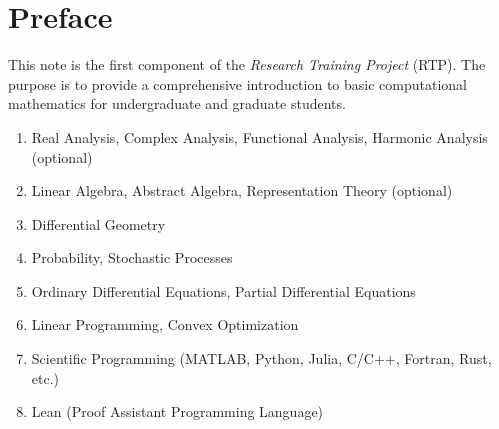 \chapter*{Preface}

This note is the first component of the \emph{Research Training Project} (RTP).  The purpose is to provide a comprehensive introduction to basic computational mathematics for undergraduate and graduate students. 

\vspace{2cm}

{}

\begin{enumerate}
    \item Real Analysis, Complex Analysis, Functional Analysis, Harmonic Analysis (optional)
    \item Linear Algebra, Abstract Algebra, Representation Theory (optional) 
    \item Differential Geometry
    \item Probability, Stochastic Processes
    \item Ordinary Differential Equations, Partial Differential Equations 
    \item Linear Programming, Convex Optimization
    \item Scientific Programming (MATLAB, Python, Julia, C/C++, Fortran, Rust, etc.)
    \item Lean (Proof Assistant Programming Language)
\end{enumerate}